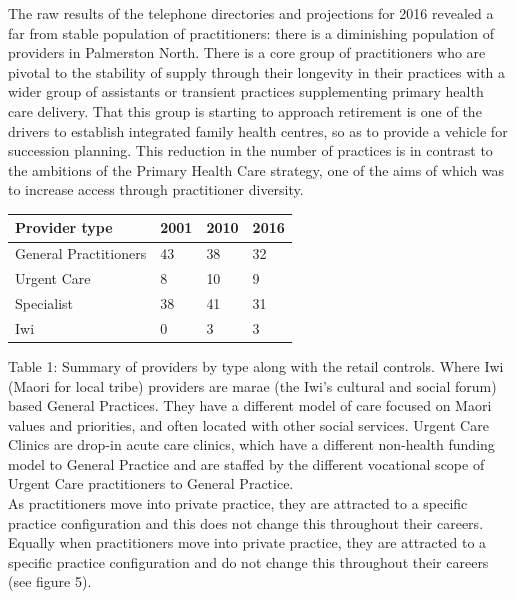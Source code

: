 \documentclass[11pt,a4paper]{article}
\begin{document}
\pagebreak

The raw results of the telephone directories and projections for 2016 revealed a far from stable population of practitioners: there is a diminishing population of providers in Palmerston North. There is a core group of practitioners who are pivotal to the stability of supply through their longevity in their practices with a wider group of assistants or transient practices supplementing primary health care delivery. That this group is starting to approach retirement is one of the drivers to establish integrated family health centres, so as to provide a vehicle for succession planning. This reduction in the number of practices is in contrast to the ambitions of the Primary Health Care strategy, one of the aims of which was to increase access through practitioner diversity.  \\

\begin{center}

\begin{tabular}{|l|l|l|l|}
\hline
	Provider type & 2001 & 2010 & 2016\\
\hline
	General Practitioners & 43 & 38 & 32\\
\hline
	Urgent Care & 8 & 10 & 9\\
\hline
	Specialist & 38 & 41 & 31\\
\hline
	Iwi & 0 & 3 & 3\\
\hline
\end{tabular}

\end{center}

Table 1: Summary of providers by type along with the retail controls. Where Iwi (Maori for local tribe) providers are marae (the Iwi's cultural and social forum) based General Practices. They have a different model of care focused on Maori values and priorities, and often located with other social services. Urgent Care Clinics are drop-in acute care clinics, which have a different non-health funding model to General Practice and are staffed by the different vocational scope of Urgent Care practitioners to General Practice. \\

As practitioners move into private practice, they are attracted to a specific practice configuration and this does not change this throughout their careers. Equally when practitioners move into private practice, they are attracted to a specific practice configuration and do not change this throughout their careers (see figure 5). \\
\end{document}
